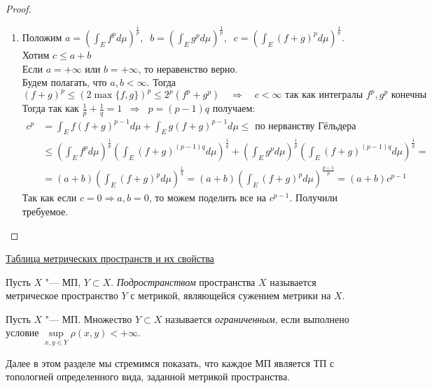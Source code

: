 \begin{proof}
\begin{enumerate}
    \item Положим $a = \left(\int_Ef^pd\mu\right)^{\frac 1p}, \;\; b = \left(\int_Eg^pd\mu\right)^{\frac 1p}, \;\; c = \left(\int_E(f + g)^pd\mu\right)^{\frac 1p}$. Хотим $c \leqslant a + b$ \\
    Если $a = +\infty$ или $b =+\infty$, то неравенство верно. \\
    Будем полагать, что $a, b < \infty$. Тогда 
    \[(f+g)^p \leqslant (2  \max\{f,g\})^p \leqslant 2^p (f^p + g^p) \quad \Rightarrow \quad c < \infty \text{  так как интегралы $f^p, g^p$ конечны}\]
    Тогда так как $\frac{1}{p} + \frac{1}{q} = 1 \;\; \Rightarrow \;\; p = (p-1)q$ получаем:
    \begin{align*}
        c^p &= \int_Ef(f+g)^{p-1}d\mu + \int_Eg(f+g)^{p-1}d\mu \leqslant \text{ по нерванству Гёльдера} \\
        &\leqslant \left(\int_Ef^pd\mu\right)^{\frac{1}{p}} \left(\int_E(f+g)^{(p-1)q}d\mu\right)^{\frac{1}{q}} +
        \left(\int_Eg^pd\mu\right)^{\frac{1}{p}} \left(\int_E(f+g)^{(p-1)q}d\mu\right)^{\frac{1}{q}} = \\
        & = (a + b) \left(\int_E(f+g)^{p}d\mu\right)^{\frac{1}{q}} = (a + b) \left(\int_E(f+g)^{p}d\mu\right)^{\frac{p-1}{p}} = (a + b) c^{p-1}
    \end{align*}
    Так как если $c = 0 \Rightarrow a,b=0$, то можем поделить все на $c^{p-1}$. Получили требуемое.
\end{enumerate}
\end{proof}

\begin{example}
    \hyperref[sec:table_of_examples]{Таблица метрических пространств и их свойства}
\end{example}




\begin{definition}
	Пусть $X$ "--- МП, $Y \subset X$. \textit{Подространством} пространства $X$ называется метрическое пространство $Y$ с метрикой, являющейся сужением метрики на $X$.
\end{definition}

\begin{definition}
	Пусть $X$ "--- МП. Множество $Y \subset X$ называется \textit{ограниченным}, если выполнено условие $\sup\limits_{x, y \in Y} \rho(x, y) < +\infty$.
\end{definition}

\begin{note}
	Далее в этом разделе мы стремимся показать, что каждое МП является ТП с топологией определенного вида, заданной метрикой пространства.
\end{note}

